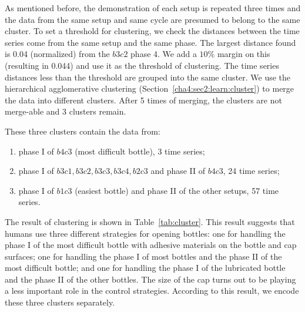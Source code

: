 As mentioned before, the demonstration of each setup is repeated three times and the data from the same setup and same cycle are presumed to belong to the same cluster. To set a threshold for clustering, we check the distances between the time series come from the same setup and the same phase. The largest distance found is 0.04 (normalized) from the $b3c2$ phase 4. We add a $10\%$ margin on this (resulting in 0.044) and use it as the threshold of clustering. The time series distances less than the threshold are grouped into the same cluster. We use the hierarchical agglomerative clustering (Section~\ref{cha4:sec2:learn:cluster}) to merge the data into different clusters. After 5 times of merging, the clusters are not merge-able and 3 clusters remain.

These three clusters contain the data from:

\begin{enumerate}
\item phase I of $b4c3$ (most difficult bottle), 3 time series;
\item phase I of $b3c1, b3c2, b3c3, b3c4, b2c3$ and phase II of $b4c3$, 24 time series;
\item phase I of $b1c3$ (easiest bottle) and phase II of the other setups, 57 time series.
\end{enumerate}

The result of clustering is shown in Table~\ref{tab:cluster}. This result suggests that humans use three different strategies for opening bottles: one for handling the phase I of the most difficult bottle with adhesive materials on the bottle and cap surfaces; one for handling the phase I of most bottles and the phase II of the most difficult bottle; and one for handling the phase I of the lubricated bottle and the phase II of the other bottles. The size of the cap turns out to be playing a less important role in the control strategies. According to this result, we encode these three clusters separately.



